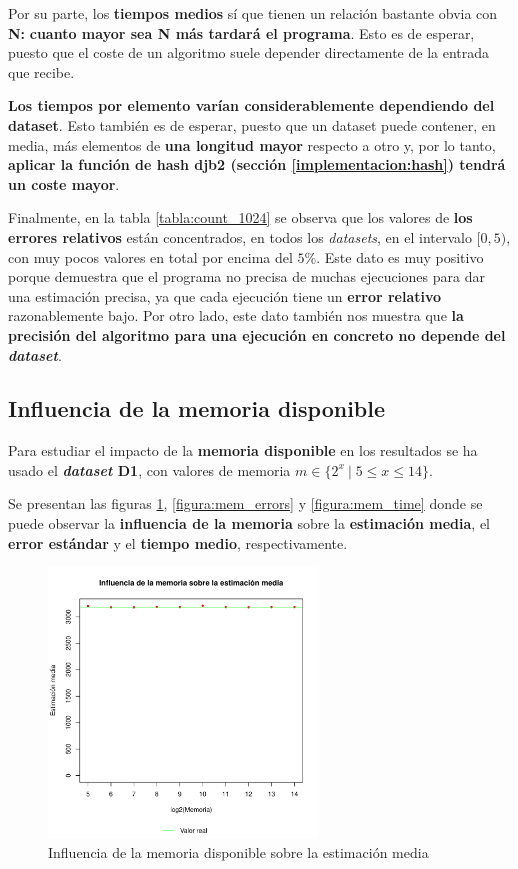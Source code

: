 Por su parte, los \textbf{tiempos medios} sí que tienen un relación bastante obvia con \textbf{N:}
\textbf{cuanto mayor sea \textbf{N} más tardará el programa}. Esto es de esperar, puesto que el coste de un algoritmo suele
depender directamente de la entrada que recibe.

\textbf{Los tiempos por elemento varían considerablemente dependiendo del dataset}. Esto también es de esperar, puesto que
un dataset puede contener, en media, más elementos de \textbf{una longitud mayor} respecto a otro y, por lo tanto,
\textbf{aplicar la función de hash djb2 (sección \ref{implementacion:hash}) tendrá un coste mayor}.

Finalmente, en la tabla \ref{tabla:count_1024} se observa que los valores de \textbf{los errores relativos} están
concentrados, en todos los \emph{datasets}, en el intervalo $[0,5)$, con muy pocos valores en total por encima del $5\%$.
Este dato es muy positivo porque demuestra que el programa no precisa de muchas ejecuciones para dar una
estimación precisa, ya que cada ejecución tiene un \textbf{error relativo} razonablemente bajo. Por otro lado, este dato también
nos muestra que \textbf{la precisión del algoritmo para una ejecución en concreto no depende del \emph{dataset}}.

\subsection{Influencia de la memoria disponible}
\label{analisis:D1_mem}

Para estudiar el impacto de la \textbf{memoria disponible} en los resultados se ha usado el \textbf{\emph{dataset} D1},
con valores de memoria $m \in \{ 2^x \: | \; 5 \leq x \leq 14 \}$.

Se presentan las figuras \ref{figura:mem_estimation}, \ref{figura:mem_errors} y \ref{figura:mem_time} donde se puede observar la
\textbf{influencia de la memoria} sobre la \textbf{estimación media}, el \textbf{error estándar} y el \textbf{tiempo medio},
respectivamente.

\begin{figure}[h!]
    \centering
        \includegraphics[width=0.64\textwidth]{../figs/D1/mem_estimation_rel.pdf}
        \caption{Influencia de la memoria disponible sobre la estimación media}
    \label{figura:mem_estimation}
\end{figure}

